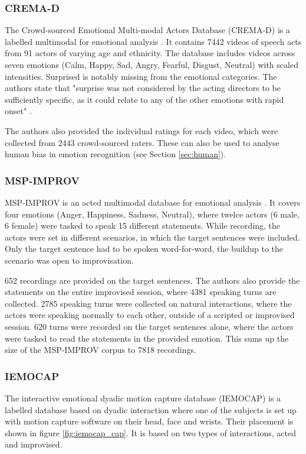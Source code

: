 \subsubsection{CREMA-D}
The Crowd-sourced Emotional Multi-modal Actors Database (CREMA-D) is a labelled multimodal for emotional analysis \cite{cao2014crema}. It contains 7442 videos of speech acts from 91 actors of varying age and ethnicity. The database includes videos across seven emotions (Calm, Happy, Sad, Angry, Fearful, Disgust, Neutral) with scaled intensities. Surprised is notably missing from the emotional categories. The authors state that "surprise was not considered by the acting directors to be sufficiently specific, as it could relate to any of the other emotions with rapid onset" \cite{cao2014crema}. 

The authors also provided the individual ratings for each video, which were collected from 2443 crowd-sourced raters. These can also be used to analyse human bias in emotion recognition (see Section \ref{sec:human}).

\subsubsection{MSP-IMPROV}
MSP-IMPROV is an acted multimodal database for emotional analysis \cite{busso2016msp}. It covers four emotions (Anger, Happiness, Sadness, Neutral), where twelce actors (6 male, 6 female) were tasked to speak 15 different statements. While recording, the actors were set in different scenarios, in which the target sentences were included. Only the target sentence had to be spoken word-for-word, the buildup to the scenario was open to improvisation.

652 recordings are provided on the target sentences. The authors also provide the statements on the entire improvised session, where 4381 speaking turns are collected. 2785 speaking turns were collected on natural interactions, where the actors were speaking normally to each other, outside of a scripted or improvised session. 620 turns were recorded on the target sentences alone, where the actors were tasked to read the statements in the provided emotion. This sums up the size of the MSP-IMPROV corpus to 7818 recordings. 

\subsubsection{IEMOCAP}
The interactive emotional dyadic motion capture database (IEMOCAP) \cite{busso2008iemocap} is a labelled database based on dyadic interaction where one of the subjects is set up with motion capture software on their head, face and wrists. Their placement is shown in figure \ref{fig:iemocap_cap}. It is based on two types of interactions, acted and improvised.

